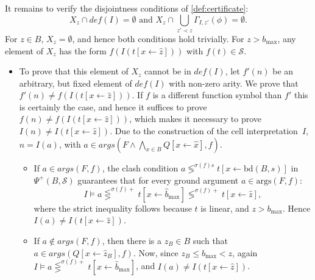 \documentclass[runningheads]{llncs}
\newcommand{\cmpsign}[1]{\lesseqgtr^{#1}}
\newcommand{\cmpsignstrict}[1]{\lessgtr^{#1}}
\newcommand{\coeffsign}[1]{\sigma(#1)}
\newcommand{\ivbound}[2]{\text{bd}(#1,#2)}
\newcommand{\args}{\text{args}}
\newcommand{\subst}[3]{#1[#2\leftarrow #3]}
\newcommand{\repr}[1]{\hat{#1}}
\begin{document}
It remains to verify the disjointness conditions of \cref{def:certificate}:
\[X_z\cap \mathit{def}(I)=\emptyset \text{ and } X_z\cap\bigcup_{z'\prec z} \Gamma_{I,z'}(\phi)=\emptyset.\]
For $z \in B$, $X_z = \emptyset$, and hence both conditions hold trivially.  For $z > b_{\max}$, any element of $X_z$ has the form $f(I(\subst{t}{x}{\repr{z}}))$ with $f(t) \in \mathcal{S}$.
    \begin{itemize}
    \item To prove that this element of $X_z$ cannot be in $\mathit{def}(I)$, let $f'(n)$ be an arbitrary, but fixed element of $\mathit{def}(I)$ with non-zero arity. We prove that $f'(n)\neq f(I(\subst{t}{x}{\repr{z}}))$. If $f$ is a different function symbol than $f'$ this is certainly the case, and hence it suffices to prove $f(n)\neq f(I(\subst{t}{x}{\repr{z}}))$, which makes it necessary to prove $I(n)\neq I(\subst{t}{x}{\repr{z}})$. Due to the construction of the cell interpretation~$I$, $n=I(a)$, with $a\in args(F \land \bigwedge_{x \in B} \subst{Q}{x}{\repr{x}}, f)$.
      \begin{itemize}
      \item       If $a\in args(F, f)$, the clash condition $a\cmpsignstrict{\coeffsign{f}s}\subst{t}{x}{\ivbound{B}{s}}$ in $\Psi^+(B,\mathcal{S})$ guarantees that for every ground argument $a \in \args(F,f)$:
        \[
        I\models a\cmpsign{\coeffsign{f}+}  \subst{t}{x}{\repr{b}_{\max}} \cmpsignstrict{\coeffsign{f}+} \subst{t}{x}{\repr{z}},
        \]
        where the strict inequality follows because $t$ is linear, and $z > b_{\max}$. Hence $I(a)\neq I(\subst{t}{x}{\repr{z}})$.
      \item If  $a\not\in args(F, f)$, then there is a $z_B\in B$ such that $a\in args(Q[x\leftarrow \hat{z}_B],f)$.   Now, since $z_B\leq b_{\max}<z$,  again  $I\models a\cmpsign{\coeffsign{f}+}  \subst{t}{x}{\repr{b}_{\max}}$, and  $I(a)\neq I(\subst{t}{x}{\repr{z}})$.
      \end{itemize}


\end{itemize}
\end{document}
